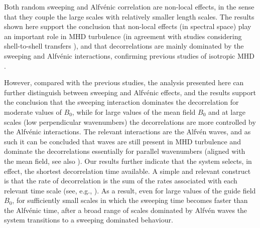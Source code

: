 \documentclass[aip,pop,reprint,amsmath,amssymb,floatfix]{revtex4-1}
\begin{document}
Both random sweeping and Alfv\'enic correlation are non-local effects,
in the sense that they couple the large scales with relatively smaller
length scales. The results shown here support the conclusion that
non-local effects (in spectral space) play an important role in MHD
turbulence (in agreement with studies considering shell-to-shell
transfers \cite{alexakis_turbulent_2007, alexakis_anisotropic_2007,
  teaca_energy_2009, mininni_scale_2011}), and that decorrelations are
mainly dominated by the sweeping and Alfv\'enic interactions,
confirming previous studies of isotropic MHD
\cite{servidio_time_2011}.

However, compared with the previous studies, the analysis presented
here can further distinguish between sweeping and Alfv\'enic effects,
and the results support the conclusion that the sweeping interaction
dominates the decorrelation for moderate values of $B_0$, while for
large values of the mean field $B_0$ and at large scales (low
perpendicular wavenumbers) the decorrelations are more controlled by
the Alfv\'enic interactions.  The relevant interactions are the
Alfv\'en waves, and as such it can be concluded that waves are still
present in MHD turbulence and dominate the decorrelations essentially
for parallel wavenumbers (aligned with the mean field, see also
\cite{meyrand_direct_2016, meyrand_weak_2015}). Our results further
indicate that the system selects, in effect, the shortest
decorrelation time available.  A simple and relevant construct is that
the rate of decorrelation is the sum of the rates associated with each
relevant time scale (see, e.g., \cite{pouquet_strong_1976,
  zhou_magnetohydrodynamic_2004}). As a result, even for large values
of the guide field $B_0$, for sufficiently small scales in which the
sweeping time becomes faster than the Alfv\'enic time, after a broad
range of scales dominated by Alfv\'en waves the system transitions to
a sweeping dominated behaviour.
\end{document}
